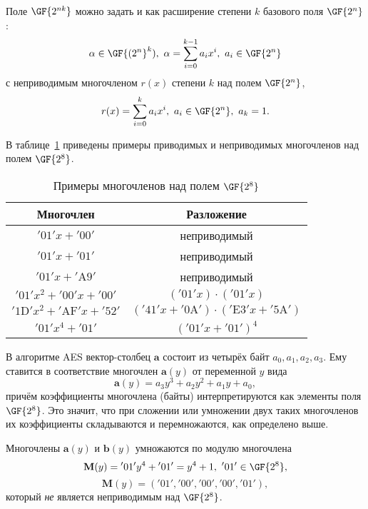 Поле $\GF{2^{nk}}$ можно задать и как расширение степени $k$ базового поля $\GF{2^n}$:
    \[ \alpha \in \GF{(2^n}^k), ~ \alpha = \sum\limits_{i=0}^{k-1} a_i x^i, ~ a_i \in \GF{2^n} \]
с неприводимым многочленом $r(x)$ степени $k$ над полем $\GF{2^n}$,
    \[ r(x) = \sum\limits_{i=0}^{k} a_i x^i, ~ a_i \in \GF{2^n}, ~ a_k = 1. \]

В таблице~\ref{tab:irreducible-gf8} приведены примеры приводимых и неприводимых многочленов над полем $\GF{2^8}$.
\begin{table}[!ht]
    \centering
    \caption{Примеры многочленов над полем $\GF{2^8}$\label{tab:irreducible-gf8}}
    \begin{tabular}{|c|c|}
        \hline
        Многочлен & Разложение \\
        \hline
        $\mathrm{'01'} x + \mathrm{'00'}$ & неприводимый \\
        $\mathrm{'01'} x + \mathrm{'01'}$ & неприводимый \\
        $\mathrm{'01'} x + \mathrm{'A9'}$ & неприводимый \\
        $\mathrm{'01'} x^2 + \mathrm{'00'} x + \mathrm{'00'}$ & $(\mathrm{'01'} x) \cdot (\mathrm{'01'} x)$ \\
        $\mathrm{'1D'} x^2 + \mathrm{'AF'} x + \mathrm{'52'}$ & $(\mathrm{'41'} x + \mathrm{'0A'}) \cdot (\mathrm{'E3'} x + \mathrm{'5A'})$ \\
        $\mathrm{'01'} x^4 + \mathrm{'01'}$ & $(\mathrm{'01'} x + \mathrm{'01'})^4$ \\
        \hline
    \end{tabular}
\end{table}
\exampleend

В алгоритме AES вектор-столбец $\mathbf{a}$ состоит из четырёх байт $a_{0}, a_{1}, a_{2}, a_{3}$. Ему ставится в соответствие многочлен $\mathbf{a}(y)$ от переменной $y$ вида
    \[ \mathbf{a}(y) = a_{3}y^{3}+a_{2}y^{2}+a_{1}y+a_{0}, \]
причём коэффициенты многочлена (байты) интерпретируются как элементы поля $\GF{2^{8}}$. Это значит, что при сложении или умножении двух таких многочленов их коэффициенты складываются и перемножаются, как определено выше.

Многочлены $\mathbf{a}(y)$ и $\mathbf{b}(y)$ умножаются по модулю многочлена
    \[ \mathbf{M}(y)= \mathrm{'01'} y^4 + \mathrm{'01'} = y^4 + 1, ~ \mathrm{'01'} \in \GF{2^8}, \]
    \[ \mathbf{M}(y)= (\mathrm{'01'}, \mathrm{'00'},\mathrm{'00'}, \mathrm{'00'}, \mathrm{'01'}), \]
который \emph{не} является неприводимым над $\GF{2^8}$.

